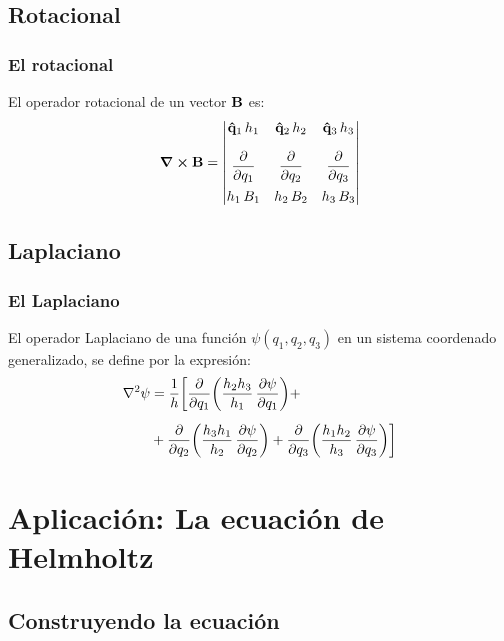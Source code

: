 \documentclass[12pt]{beamer}
\begin{document}
\subsection{Rotacional}

\begin{frame}
\frametitle{El rotacional}
El operador rotacional de un vector $\vb{B}$ es:
\pause
\begin{align*}
\curl{\vb{B}} = \mqty|
\vu{q}_{1} \, h_{1} & \vu{q}_{2} \, h_{2} & \vu{q}_{3} \, h_{3} \\[1em]
\displaystyle \pdv{q_{1}} & \displaystyle \pdv{q_{2}} & \displaystyle \pdv{q_{3}} \\[1em]
h_{1} \, B_{1} & h_{2} \, B_{2} & h_{3} \, B_{3}
|
\end{align*}
\end{frame}

\subsection{Laplaciano}

\begin{frame}
\frametitle{El Laplaciano}
El operador Laplaciano de una función $\psi (q_{1}, q_{2}, q_{3})$ en un sistema coordenado generalizado, se define por la expresión:
\pause
\begin{align*}
\laplacian{\psi} &= \dfrac{1}{h} \bigg[ \pdv{q_{1}} \bigg( \dfrac{h_{2} h_{3}}{h_{1}} \, \pdv{\psi}{q_{1}} \bigg) + \\[0.5em]
&+ \pdv{q_{2}} \bigg( \dfrac{h_{3} h_{1}}{h_{2}} \, \pdv{\psi}{q_{2}} \bigg) + \pdv{q_{3}} \bigg( \dfrac{h_{1} h_{2}}{h_{3}} \, \pdv{\psi}{q_{3}} \bigg) \bigg]
\end{align*}
\end{frame}

\section{Aplicación: La ecuación de Helmholtz}
\subsection{Construyendo la ecuación}
\end{document}
